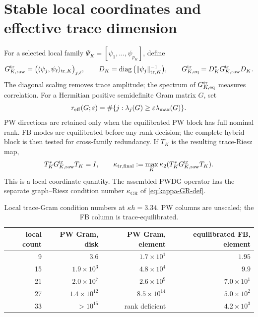 \documentclass[11pt]{article}
\newcommand{\GR}{\mathrm{GR}}
\DeclareMathOperator{\diag}{diag}
\numberwithin{equation}{section}
\begin{document}
\section{Stable local coordinates and effective trace dimension}\label{sec:conditioning}
For a selected local family $\Psi_K=[\psi_1,\ldots,\psi_{p_K}]$, define
\begin{equation}\label{eq:Gtr-raw-def}
 G_{K,\rm raw}^{\rm tr}=\big(\langle\psi_j,\psi_\ell\rangle_{{\rm tr},K}\big)_{j,\ell},
 \qquad
 D_K=\diag\big(\|\psi_j\|_{{\rm tr},K}^{-1}\big),
 \qquad
 G_{K,\rm eq}^{\rm tr}=D_K^*G_{K,\rm raw}^{\rm tr}D_K.
\end{equation}
The diagonal scaling removes trace amplitude; the spectrum of $G_{K,\rm eq}^{\rm tr}$ measures correlation.  For a Hermitian positive semidefinite Gram matrix $G$, set
\begin{equation}\label{eq:reff}
 r_{\rm eff}(G;\varepsilon)=\#\{j:\lambda_j(G)\ge\varepsilon\lambda_{\max}(G)\}.
\end{equation}
PW directions are retained only when the equilibrated PW block has full nominal rank.  FB modes are equilibrated before any rank decision; the complete hybrid block is then tested for cross-family redundancy.  If $T_K$ is the resulting trace-Riesz map,
\begin{equation}\label{eq:Gtr-orth-def}
 T_K^*G_{K,\rm raw}^{\rm tr}T_K=I,
 \qquad
 \kappa_{\rm tr,final}:=\max_K\kappa_2(T_K^*G_{K,\rm raw}^{\rm tr}T_K).
\end{equation}
This is a local coordinate quantity.  The assembled PWDG operator has the separate graph--Riesz condition number $\kappa_{\GR}$ of \eqref{eq:kappa-GR-def}.

\begin{table}[htbp]
\centering
\caption{Local trace-Gram condition numbers at $\kappa h=3.34$.  PW columns are unscaled; the FB column is trace-equilibrated.}
\label{tab:localcond}
\footnotesize
\begin{tabular}{rrrr}
\toprule
local count & PW Gram, disk & PW Gram, element & equilibrated FB, element\\
\midrule
9  & $3.6$ & $1.7\times10^1$ & $1.95$\\
15 & $1.9\times10^3$ & $4.8\times10^4$ & $9.9$\\
21 & $2.0\times10^7$ & $2.6\times10^9$ & $7.0\times10^1$\\
27 & $1.4\times10^{12}$ & $8.5\times10^{14}$ & $5.0\times10^2$\\
33 & $>10^{15}$ & rank deficient & $4.2\times10^3$\\
\bottomrule
\end{tabular}
\end{table}
\end{document}

